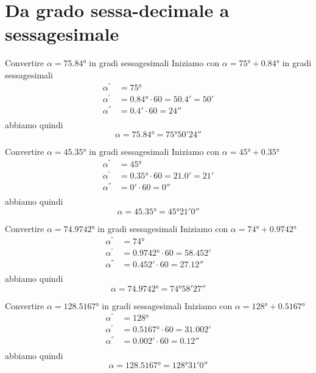 \section{Da grado sessa-decimale a sessagesimale}
\tcbstartrecording
\begin{exercise}
	Convertire $\alpha=\ang{75.84}$ in gradi sessagesimali
	\tcblower
	Iniziamo con
	$\alpha=\ang{75}+\ang{0.84}$ in gradi sessagesimali
	\begin{align*}
	\alpha^{\si{\degree}}&=\ang{75}\\ 
	\alpha^{\si{\arcminute}}&=\ang{0.84}\cdot 60=\ang{;50.4;}=\ang{;50;}\\
	\alpha^{\si{\arcsecond}}&=\ang{;0.4;}\cdot 60=\ang{;;24}\\
	\end{align*}
	abbiamo quindi
	\[\alpha=\ang{75.84}=\ang{75;50;24}\]
\end{exercise}
\begin{exercise}
Convertire $\alpha=\ang{45.35}$ in gradi sessagesimali
	\tcblower
Iniziamo con 
$\alpha=\ang{45}+\ang{0.35}$
\begin{align*}
\alpha^{\si{\degree}}&=\ang{45}\\ 
\alpha^{\si{\arcminute}}&=\ang{0.35}\cdot 60=\ang{;21.0;}=\ang{;21;}\\
\alpha^{\si{\arcsecond}}&=\ang{;0;}\cdot 60=\ang{;;0}\\
\end{align*}
abbiamo quindi
\[\alpha=\ang{45.35}=\ang{45;21;0}\]
\end{exercise}
\begin{exercise}
	Convertire $\alpha=\ang{74.9742}$ in gradi sessagesimali
	\tcblower
	Iniziamo con 
	$\alpha=\ang{74}+\ang{0.9742}$
	\begin{align*}
	\alpha^{\si{\degree}}&=\ang{74}\\ 
	\alpha^{\si{\arcminute}}&=\ang{0.9742}\cdot 60=\ang{;58.452;}\\
	\alpha^{\si{\arcsecond}}&=\ang{;0.452;}\cdot 60=\ang{;;27.12}\\
	\end{align*}
	abbiamo quindi
	\[\alpha=\ang{74.9742}=\ang{74;58;27}\]
\end{exercise}
\begin{exercise}
	Convertire $\alpha=\ang{128.5167}$ in gradi sessagesimali
	\tcblower
	Iniziamo con 
	$\alpha=\ang{128}+\ang{0.5167}$
	\begin{align*}
	\alpha^{\si{\degree}}&=\ang{128}\\ 
	\alpha^{\si{\arcminute}}&=\ang{0.5167}\cdot 60=\ang{;31.002;}\\
	\alpha^{\si{\arcsecond}}&=\ang{;0.002;}\cdot 60=\ang{;;0.12}\\
	\end{align*}
	abbiamo quindi
	\[\alpha=\ang{128.5167}=\ang{128;31;0}\]
\end{exercise}
